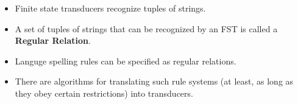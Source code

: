 \begin{frame}

	\frametitle{\insertsection}
	\framesubtitle{\insertsubsection}
	
	\begin{itemize}
		\item Finite state transducers recognize tuples of strings.
		\item A set of tuples of strings that can be recognized by an FST is called a \textbf{Regular Relation}.
		\item Languge spelling rules can be specified as regular relations.
		\item There are algorithms for translating such rule systems (at least, as long as they obey certain restrictions) into transducers.
	\end{itemize}

\end{frame}